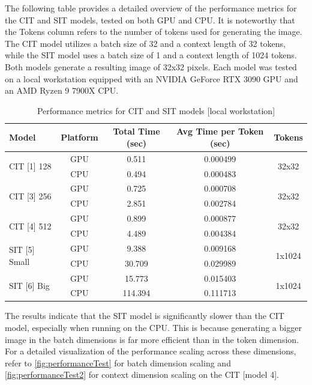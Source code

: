     The following table provides a detailed overview of the performance metrics for the CIT and SIT models, tested on both GPU and CPU. It is noteworthy that the Tokens column refers to the number of tokens used for generating the image. The CIT model utilizes a batch size of 32 and a context length of 32 tokens, while the SIT model uses a batch size of 1 and a context length of 1024 tokens. Both models generate a resulting image of 32x32 pixels. Each model was tested on a local workstation equipped with an NVIDIA GeForce RTX 3090 GPU and an AMD Ryzen 9 7900X CPU.

    \begin{table}[H]
        \centering
        \small
        \begin{tabular}{|l|c|c|c|c|}
        \hline
        \textbf{Model} & \textbf{Platform} & \textbf{Total Time (sec)} & \textbf{Avg Time per Token (sec)} & \textbf{Tokens} \\ \hline
        \multirow{2}{*}{CIT [1] 128} & GPU & 0.511 & 0.000499 & \multirow{2}{*}{32x32} \\ \cline{2-4}
                                           & CPU  & 0.494 & 0.000483 &  \\ \hline
        \multirow{2}{*}{CIT [3] 256} & GPU & 0.725 & 0.000708 & \multirow{2}{*}{32x32} \\ \cline{2-4}
                                           & CPU  & 2.851 & 0.002784 &  \\ \hline
        \multirow{2}{*}{CIT [4] 512} & GPU & 0.899 & 0.000877 & \multirow{2}{*}{32x32} \\ \cline{2-4}
                                           & CPU  & 4.489 & 0.004384 &  \\ \hline
        \multirow{2}{*}{SIT [5] Small} & GPU & 9.388 & 0.009168 & \multirow{2}{*}{1x1024} \\ \cline{2-4}
                                             & CPU  & 30.709 & 0.029989 &  \\ \hline
        \multirow{2}{*}{SIT [6] Big} & GPU & 15.773 & 0.015403 & \multirow{2}{*}{1x1024} \\ \cline{2-4}
                                           & CPU  & 114.394 & 0.111713 &  \\ \hline
        \end{tabular}
        \caption{Performance metrics for CIT and SIT models [local workstation]}
        \label{tab:performance_metrics}
    \end{table}
        
    The results indicate that the SIT model is significantly slower than the CIT model, especially when running on the CPU. This is because generating a bigger image in the batch dimensions is far more efficient than in the token dimension. For a detailed visualization of the performance scaling across these dimensions, refer to \autoref{fig:performanceTest} for batch dimension scaling and \autoref{fig:performanceTest2} for context dimension scaling on the CIT [model 4].

